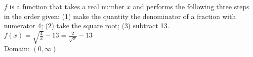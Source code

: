 {$f$ is a function that takes a real number $x$ and performs the following three steps in the order given: (1) make the quantity the denominator of a fraction with numerator 4; (2) take the square root; (3) subtract 13.
}
{$f(x) = \sqrt{\frac{4}{x}} - 13 = \frac{2}{\sqrt{x}} - 13$ \\ Domain: $(0, \infty)$}